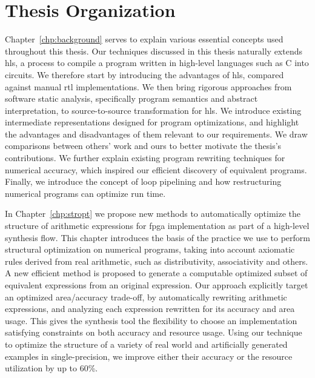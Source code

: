\section{Thesis Organization}
\label{intro:sec:organization}

Chapter~\ref{chp:background} serves to explain various essential concepts
used throughout this thesis.  Our techniques discussed in this thesis
naturally extends \gls{hls}, a process to compile a program written in
high-level languages such as C into circuits.  We therefore start by
introducing the advantages of \gls{hls}, compared against manual \gls{rtl}
implementations.  We then bring rigorous approaches from software static
analysis, specifically program semantics and abstract interpretation, to
source-to-source transformation for \gls{hls}\@.  We introduce existing
intermediate representations designed for program optimizations, and highlight
the advantages and disadvantages of them relevant to our requirements.  We
draw comparisons between others' work and ours to better motivate the thesis's
contributions.  We further explain existing program rewriting techniques for
numerical accuracy, which inspired our efficient discovery of equivalent
programs.  Finally, we introduce the concept of loop pipelining and how
restructuring numerical programs can optimize run time.

In Chapter~\ref{chp:stropt} we propose new methods to automatically optimize
the structure of arithmetic expressions for \gls{fpga} implementation as part
of a high-level synthesis flow.  This chapter introduces the basis of the
practice we use to perform structural optimization on numerical programs,
taking into account axiomatic rules derived from real arithmetic, such as
distributivity, associativity and others.  A new efficient method is proposed
to generate a computable optimized subset of equivalent expressions from an
original expression.  Our approach explicitly target an optimized area/accuracy
trade-off, by automatically rewriting arithmetic expressions, and analyzing
each expression rewritten for its accuracy and area usage.  This gives
the synthesis tool the flexibility to choose an implementation satisfying
constraints on both accuracy and resource usage.  Using our technique to
optimize the structure of a variety of real world and artificially generated
examples in single-precision, we improve either their accuracy or the resource
utilization by up to 60\%.

